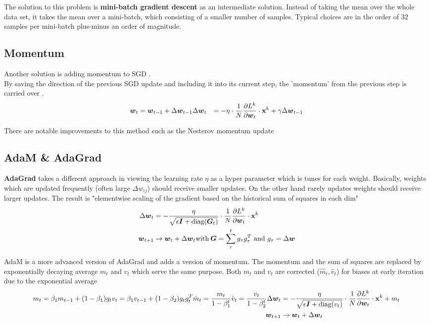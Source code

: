 The solution to this problem is \textbf{mini-batch gradient descent} as an intermediate solution.
Instead of taking the mean over the whole data set, it takes the mean over a mini-batch, which consisting of a smaller number of samples.
Typical choices are in the order of 32 samples per mini-batch plus-minus an order of magnitude.

\subsection{Momentum}
Another solution is adding momentum to SGD \cite{momentum}.\\
By saving the direction of the previous SGD update and including it into its current step, the 'momentum' from the previous step is carried over \cite{ommer}.
\begin{align}
    \boldsymbol{w}_t & = \boldsymbol{w}_{t-1} + \Delta \boldsymbol{w}_{t-1}
    \Delta \boldsymbol{w}_t & = - \eta \cdot \frac{1}{N} \frac{\partial L^k}{\partial \boldsymbol{w}_t} \cdot \mathbf{x}^k + \gamma \Delta \boldsymbol{w}_{t-1}\\
\end{align}

There are notable improvements to this method such as the Nesterov momentum update \cite{ommer}

\subsection{AdaM \& AdaGrad}
\textbf{AdaGrad} takes a different approach in viewing the learning rate $\eta$ as a hyper parameter which is tunes for each weight.
Basically, weights which are updated frequently (often large $\Delta w_{ij}$) should receive smaller updates.
On the other hand rarely updates weights should receive larger updates.
The result is "elementwise scaling of the gradient based on the historical sum of squares in each dim" \cite{ommer}
\begin{align}
    \Delta \boldsymbol{w}_t & = - \frac{\eta}{\sqrt{\epsilon \boldsymbol{I} + \text{diag}(\boldsymbol{G}_t)}} \cdot \frac{1}{N} \frac{\partial L^k}{\partial \boldsymbol{w}_t} \cdot \mathbf{x}^k \\
    \boldsymbol{w}_{t+1} & \rightarrow \boldsymbol{w}_t + \Delta \boldsymbol{w}_t
    \text{with} \: \boldsymbol{G} = \sum_{\tau}^{t} g_\tau g_\tau^T \text{ and } g_\tau = \Delta \boldsymbol{w}
\end{align}

AdaM is a more advanced version of AdaGrad and adds a version of momentum.
The momentum and the sum of squares are replaced by exponentially decaying average $m_t$ and $v_t$ which serve the same purpose.
Both $m_t$ and $v_t$ are corrected ($\hat{m}_t, \hat{v}_t$) for biases at early iteration due to the exponential average
\begin{align}
    m_t = \beta_1 m_{t-1} + (1 - \beta_1) g_t
    v_t = \beta_1 v_{t-1} + (1 - \beta_2) g_t g_t^T
    \hat{m}_t = \frac{m_t}{1 - \beta_1^t}
    \hat{v}_t = \frac{v_t}{1 - \beta_2^t}
    \Delta \boldsymbol{w}_t & = - \frac{\eta}{\sqrt{\epsilon \boldsymbol{I} + \text{diag}(v_t)}} \cdot \frac{1}{N} \frac{\partial L^k}{\partial \boldsymbol{w}_t} \cdot \mathbf{x}^k + m_t \\
    \boldsymbol{w}_{t+1} & \rightarrow \boldsymbol{w}_t + \Delta \boldsymbol{w}_t
\end{align}

